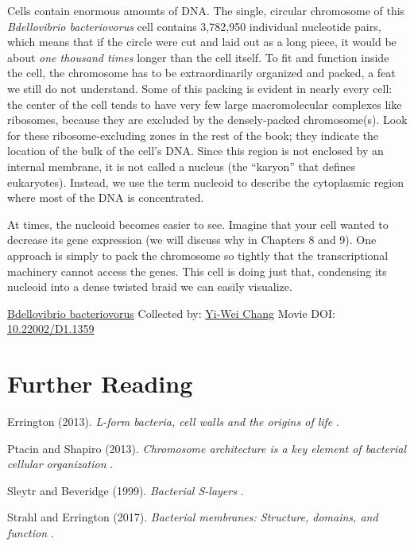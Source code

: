 \documentclass[]{tufte-book}
\begin{document}
Cells contain enormous amounts of DNA. The single, circular chromosome of this \emph{Bdellovibrio bacteriovorus} cell contains 3,782,950 individual nucleotide pairs, which means that if the circle were cut and laid out as a long piece, it would be about \emph{one thousand times} longer than the cell itself. To fit and function inside the cell, the chromosome has to be extraordinarily organized and packed, a feat we still do not understand. Some of this packing is evident in nearly every cell: the center of the cell tends to have very few large macromolecular complexes like ribosomes, because they are excluded by the densely-packed chromosome(s). Look for these ribosome-excluding zones in the rest of the book; they indicate the location of the bulk of the cell's DNA. Since this region is not enclosed by an internal membrane, it is not called a nucleus (the ``karyon'' that defines eukaryotes). Instead, we use the term nucleoid to describe the cytoplasmic region where most of the DNA is concentrated.

At times, the nucleoid becomes easier to see. Imagine that your cell wanted to decrease its gene expression (we will discuss why in Chapters 8 and 9). One approach is simply to pack the chromosome so tightly that the transcriptional machinery cannot access the genes. This cell is doing just that, condensing its nucleoid into a dense twisted braid we can easily visualize.



\hypertarget{htmlwidget-5eb51e703b9cfadfeb30}{}

\label{fig:2-10}\protect\hyperlink{tree}{Bdellovibrio bacteriovorus} Collected by: \protect\hyperlink{yi-wei_chang}{Yi-Wei Chang} Movie DOI: \href{https://doi.org/10.22002/D1.1359}{10.22002/D1.1359}

\hypertarget{further-reading-1}{%
\section{Further Reading}\label{further-reading-1}}

Errington (2013). \emph{L-form bacteria, cell walls and the origins of life} \citep{errington2013}.

Ptacin and Shapiro (2013). \emph{Chromosome architecture is a key element of bacterial cellular organization} \citep{ptacin2013}.

Sleytr and Beveridge (1999). \emph{Bacterial S-layers} \citep{sleytr1999}.

Strahl and Errington (2017). \emph{Bacterial membranes: Structure, domains, and function} \citep{strahl2017}.
\end{document}
